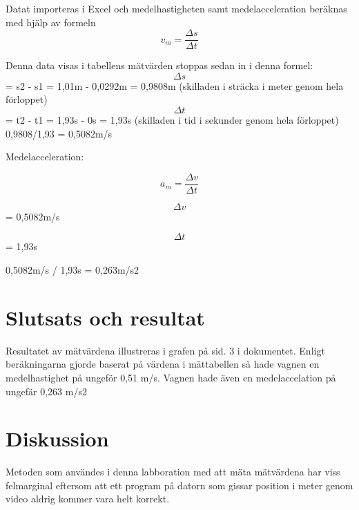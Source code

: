 \documentclass[11p, titlepage, oneside, a4paper]{article}
\begin{document}
    Datat importeras i Excel och medelhastigheten samt medelacceleration beräknas med hjälp av formeln
    \begin{equation}
        v_m = \frac{\Delta s}{\Delta t}
    \end{equation}

    Denna data visas i tabellens mätvärden stoppas sedan in i denna formel:
     \begin{equation}
    {\Delta s}
     \end{equation}
    = s2 - s1 = 1,01m - 0,0292m = 0,9808m
    (skilladen i sträcka i meter genom hela förloppet)
    \begin{equation}
    {\Delta t}
    \end{equation}
    = t2 - t1 = 1,93s - 0s = 1,93s
    (skilladen i tid i sekunder genom hela förloppet)
    0,9808/1,93 = 0,5082m/s

    Medelacceleration:

\begin{equation}
    a_m = \frac{\Delta v}{\Delta t}
\end{equation}

\begin{equation}
{\Delta v}
\end{equation}
= 0,5082m/s

\begin{equation}
{\Delta t}
\end{equation}
= 1,93s

0,5082m/s / 1,93s = 0,263m/s2
    
    \section{Slutsats och resultat} 
        Resultatet av mätvärdena illustreras i grafen på sid. 3 i dokumentet.
        Enligt beräkningarna gjorde baserat på värdena i mättabellen så hade vagnen en medelhastighet på ungeför 0,51 m/s. Vagnen hade även en medelaccelation på ungefär 0,263 m/s2
    \section{Diskussion} 
    Metoden som användes i denna labboration med att mäta mätvärdena har viss felmarginal eftersom att ett program på datorn som gissar position i meter genom video aldrig kommer vara helt korrekt.


    
    \printbibliography
\end{document}
